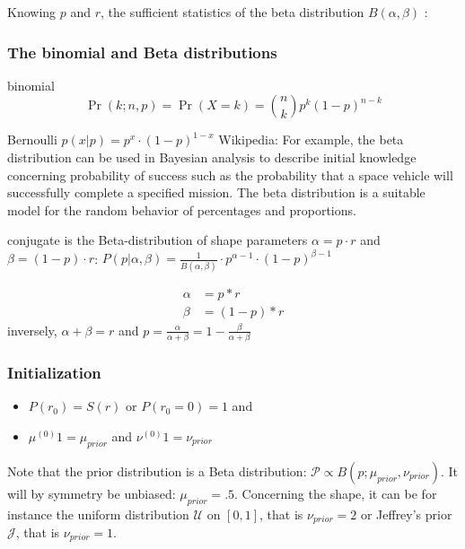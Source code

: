 \documentclass[12pt,english]{article}%
\newcommand{\eq}[1]{\begin{equation*}#1\end{equation*}}
\newcommand{\eqs}[1]{\begin{align*}#1\end{align*}}
\newcommand{\Jj}{\mathcal{J}}
\newcommand{\Pp}{\mathcal{P}}
\newcommand{\Uu}{\mathcal{U}}
\begin{document}
Knowing $p$ and $r$, the sufficient statistics of the beta distribution $B(\alpha, \beta)$ :


\subsubsection{The binomial and Beta distributions}

binomial
\eq{
\Pr(k;n,p) = \Pr(X = k) = {n\choose k}p^k(1-p)^{n-k}
}


Bernoulli $p(x | p) = p^x \cdot (1-p)^{1-x}$
Wikipedia: For example, the beta distribution can be used in Bayesian analysis to describe initial knowledge concerning probability of success such as the probability that a space vehicle will successfully complete a specified mission. The beta distribution is a suitable model for the random behavior of percentages and proportions.

conjugate is the Beta-distribution of shape parameters $\alpha = p\cdot r$ and $\beta = (1- p)\cdot r$:
$ P(p | \alpha, \beta ) = \frac{1}{B(\alpha, \beta)} \cdot p^{\alpha -1} \cdot (1-p)^{\beta - 1} $

\eqs{
        \alpha &= p*r \\
        \beta  &= (1-p)*r
    }
inversely, $\alpha + \beta = r$ and $p = \frac{\alpha}{\alpha +\beta} = 1- \frac{\beta}{\alpha + \beta}$



\subsubsection{Initialization}

	\begin{itemize}
		\item    $P(r_0)= S(r)$ or $P(r_0=0)=1$ and
		\item    $\mu^{(0)}1 = \mu_{prior}$ and $\nu^{(0)}1 = \nu_{prior}$
	\end{itemize}

Note that the prior distribution is a Beta distribution:
$\Pp\propto B(p; \mu_{prior}, \nu_{prior})$.
It will by symmetry be unbiased: $\mu_{prior}=.5$.
Concerning the shape, it can be for instance
the uniform distribution $\Uu$ on $ [ 0, 1 ] $, that is $\nu_{prior}=2$ or
Jeffrey's prior $\Jj$, that is $\nu_{prior}=1$.

\end{document}
